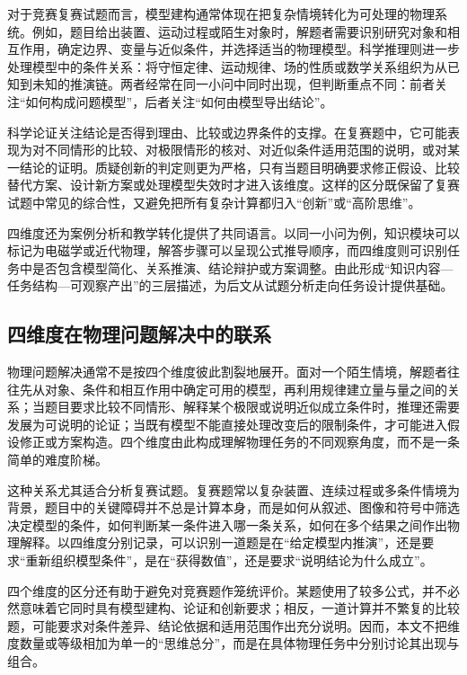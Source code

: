 \documentclass[
  12pt,
  a4paper]{ctexbook}
\begin{document}
对于竞赛复赛试题而言，模型建构通常体现在把复杂情境转化为可处理的物理系统。例如，题目给出装置、运动过程或陌生对象时，解题者需要识别研究对象和相互作用，确定边界、变量与近似条件，并选择适当的物理模型。科学推理则进一步处理模型中的条件关系：将守恒定律、运动规律、场的性质或数学关系组织为从已知到未知的推演链。两者经常在同一小问中同时出现，但判断重点不同：前者关注``如何构成问题模型''，后者关注``如何由模型导出结论''。

科学论证关注结论是否得到理由、比较或边界条件的支撑。在复赛题中，它可能表现为对不同情形的比较、对极限情形的核对、对近似条件适用范围的说明，或对某一结论的证明。质疑创新的判定则更为严格，只有当题目明确要求修正假设、比较替代方案、设计新方案或处理模型失效时才进入该维度。这样的区分既保留了复赛试题中常见的综合性，又避免把所有复杂计算都归入``创新''或``高阶思维''。

四维度还为案例分析和教学转化提供了共同语言。以同一小问为例，知识模块可以标记为电磁学或近代物理，解答步骤可以呈现公式推导顺序，而四维度则可识别任务中是否包含模型简化、关系推演、结论辩护或方案调整。由此形成``知识内容---任务结构---可观察产出''的三层描述，为后文从试题分析走向任务设计提供基础。

\subsection{四维度在物理问题解决中的联系}\label{ux56dbux7ef4ux5ea6ux5728ux7269ux7406ux95eeux9898ux89e3ux51b3ux4e2dux7684ux8054ux7cfb}

物理问题解决通常不是按四个维度彼此割裂地展开。面对一个陌生情境，解题者往往先从对象、条件和相互作用中确定可用的模型，再利用规律建立量与量之间的关系；当题目要求比较不同情形、解释某个极限或说明近似成立条件时，推理还需要发展为可说明的论证；当既有模型不能直接处理改变后的限制条件，才可能进入假设修正或方案构造。四个维度由此构成理解物理任务的不同观察角度，而不是一条简单的难度阶梯。

这种关系尤其适合分析复赛试题。复赛题常以复杂装置、连续过程或多条件情境为背景，题目中的关键障碍并不总是计算本身，而是如何从叙述、图像和符号中筛选决定模型的条件，如何判断某一条件进入哪一条关系，如何在多个结果之间作出物理解释。以四维度分别记录，可以识别一道题是在``给定模型内推演''，还是要求``重新组织模型条件''，是在``获得数值''，还是要求``说明结论为什么成立''。

四个维度的区分还有助于避免对竞赛题作笼统评价。某题使用了较多公式，并不必然意味着它同时具有模型建构、论证和创新要求；相反，一道计算并不繁复的比较题，可能要求对条件差异、结论依据和适用范围作出充分说明。因而，本文不把维度数量或等级相加为单一的``思维总分''，而是在具体物理任务中分别讨论其出现与组合。
\end{document}
